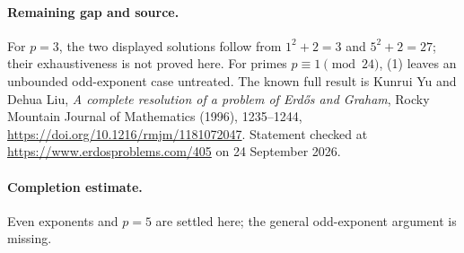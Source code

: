 \paragraph{Remaining gap and source.}
For \(p=3\), the two displayed solutions follow from
\(1^2+2=3\) and \(5^2+2=27\); their exhaustiveness is not proved here.
For primes \(p\equiv1\pmod{24}\), (1) leaves an unbounded odd-exponent
case untreated. The known full result is Kunrui Yu and Dehua Liu,
\emph{A complete resolution of a problem of Erd\H{o}s and Graham},
Rocky Mountain Journal of Mathematics (1996), 1235--1244,
\url{https://doi.org/10.1216/rmjm/1181072047}.
Statement checked at \url{https://www.erdosproblems.com/405}
on 24 September 2026.

\paragraph{Completion estimate.}
Even exponents and \(p=5\) are settled here; the general odd-exponent argument is missing.
